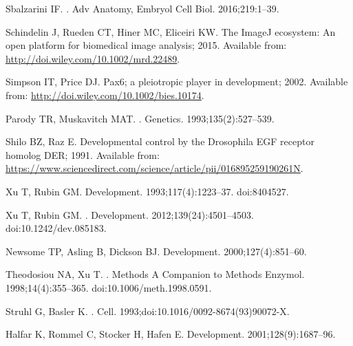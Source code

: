 \documentclass[10pt,letterpaper]{article}
\begin{document}
\begin{thebibliography}{10}
Sbalzarini IF.
.
\newblock Adv Anatomy, Embryol Cell Biol. 2016;219:1--39.

Schindelin J, Rueden CT, Hiner MC, Eliceiri KW. {The ImageJ ecosystem: An open
  platform for biomedical image analysis}; 2015.
\newblock Available from: \url{http://doi.wiley.com/10.1002/mrd.22489}.

Simpson IT, Price DJ. {Pax6; a pleiotropic player in development}; 2002.
\newblock Available from: \url{http://doi.wiley.com/10.1002/bies.10174}.

Parody TR, Muskavitch MAT.
.
\newblock Genetics. 1993;135(2):527--539.

Shilo BZ, Raz E. {Developmental control by the Drosophila EGF receptor homolog
  DER}; 1991.
\newblock Available from:
  \url{https://www.sciencedirect.com/science/article/pii/016895259190261N}.

Xu T, Rubin GM.
\newblock Development. 1993;117(4):1223--37.
\newblock doi:{8404527}.

Xu T, Rubin GM.
.
\newblock Development. 2012;139(24):4501--4503.
\newblock doi:{10.1242/dev.085183}.

Newsome TP, Asling B, Dickson BJ.
\newblock Development. 2000;127(4):851--60.

Theodosiou NA, Xu T.
.
\newblock Methods A Companion to Methods Enzymol. 1998;14(4):355--365.
\newblock doi:{10.1006/meth.1998.0591}.

Struhl G, Basler K.
.
\newblock Cell. 1993;doi:{10.1016/0092-8674(93)90072-X}.

Halfar K, Rommel C, Stocker H, Hafen E.
\newblock Development. 2001;128(9):1687--96.


\end{thebibliography}
\end{document}
